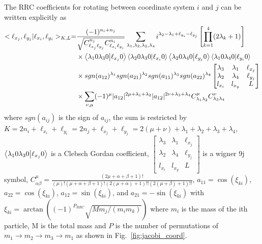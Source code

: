 The RRC coefficients for rotating between coordinate system $i$ and $j$ can be written explicitly as
\begin{align}
\nonumber
    <\ell_{x_j},\ell_{y_j}|\ell_{x_i},\ell_{y_i}>_{K,L} =& \frac{(-1)^{n_i+n_j}}{\sqrt{C_{\ell_{x_j}\ell_{y_j}}^{n_j}C_{\ell_{x_i}\ell_{y_i}}^{n_i}}} \sum\limits_{\lambda_1,\lambda_2,\lambda_3,\lambda_4} i^{\lambda_2-\lambda_1+\ell_{y_i}-\ell_{y_j}}\left[\prod_{k=1}^4 (2\lambda_k +1)\right] \\ 
\nonumber
    & \times \braket{\lambda_1 0 \lambda_3 0}{\ell_{x_j} 0} \braket{\lambda_2 0 \lambda_3 0}{\ell_{x_i} 0} \braket{\lambda_2 0 \lambda_4 0}{\ell_{y_j} 0} \braket{\lambda_1 0 \lambda_4 0}{\ell_{y_i} 0} \\
\nonumber
    & \times sgn(a_{12})^{\lambda_1}sgn(a_{21})^{\lambda_2}sgn(a_{11})^{\lambda_3}sgn(a_{22})^{\lambda_4} \begin{bmatrix}
   \lambda_3 & \lambda_1 & \ell_{x_j} \\
   \lambda_2 & \lambda_4 & \ell_{y_j} \\
   l_{x_i}   & l_{x_y}   & L
   \end{bmatrix} \\
    & \times \sum\limits_{\nu,\mu} (-1)^{\mu}|a_{12}|^{2\mu + \lambda_1 + \lambda_2} |a_{12}|^{2\nu + \lambda_3 + \lambda_4} C_{\lambda_1 \lambda_2}^{\mu} C_{\lambda_3 \lambda_4}^{\nu}
    \label{eq:RRC}
\end{align}
where $sgn(a_{ij})$ is the sign of $a_{ij}$, the sum is restricted by $K=2n_i+\ell_{x_i}+\ell_{y_i}=2n_j+\ell_{x_j}+\ell_{y_j}=2(\mu+\nu)+\lambda_1+\lambda_2+\lambda_3+\lambda_4$, $\braket{\lambda_1 0 \lambda_3 0}{\ell_{x_j} 0}$ is a Clebsch Gordan coefficient,
     $\begin{bmatrix}
        \lambda_3 & \lambda_1 & \ell_{x_j} \\
        \lambda_2 & \lambda_4 & \ell_{y_j} \\
        l_{x_i}   & l_{x_y}   & L
        \end{bmatrix}$
is a wigner 9j symbol, 
    $C_{\alpha\beta}^\mu = \frac{(2\mu+\alpha+\beta+1)!}{(\mu)!(\mu+\alpha+\beta+1)!(2(\mu+\alpha)+1)!!(2(\mu+\beta)+1)!!}$,
$a_{11} = \cos(\xi_{ki})$,
$a_{22} = \cos(\xi_{ki})$,
$a_{12} = \sin(\xi_{ki})$, and 
$a_{21} = -\sin(\xi_{ki})$
with $\xi_{ki} = \arctan((-1)^{P_{RRC}}\sqrt{Mm_j/(m_i m_k)})$ where $m_i$ is the mass of the ith particle, M is the total mass and $P$ is the number of permutations of $m_1\rightarrow m_2\rightarrow m_3\rightarrow m_1$  as shown in Fig.~\ref{fig:jacobi_coord}.

